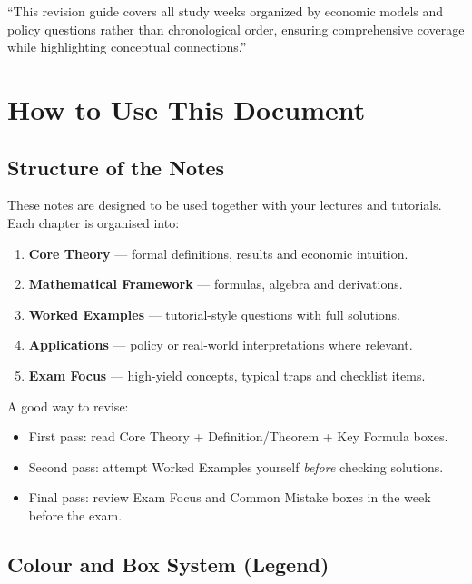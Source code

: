 \documentclass[12pt]{article}
\begin{document}
\begin{center}
\end{center}

\noindent
“This revision guide covers all study weeks organized by economic models and policy questions rather than chronological order, ensuring comprehensive coverage while highlighting conceptual connections.”

\newpage

\section*{How to Use This Document}

\subsection*{Structure of the Notes}

These notes are designed to be used together with your lectures and tutorials. Each chapter is organised into:

\begin{enumerate}
\item \textbf{Core Theory} — formal definitions, results and economic intuition.
\item \textbf{Mathematical Framework} — formulas, algebra and derivations.
\item \textbf{Worked Examples} — tutorial-style questions with full solutions.
\item \textbf{Applications} — policy or real-world interpretations where relevant.
\item \textbf{Exam Focus} — high-yield concepts, typical traps and checklist items.
\end{enumerate}

A good way to revise:
\begin{itemize}
\item First pass: read Core Theory + Definition/Theorem + Key Formula boxes.
\item Second pass: attempt Worked Examples yourself \emph{before} checking solutions.
\item Final pass: review Exam Focus and Common Mistake boxes in the week before the exam.
\end{itemize}

\subsection*{Colour and Box System (Legend)}
\end{document}
